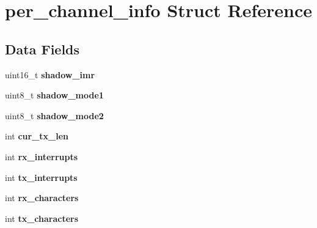 \hypertarget{structper__channel__info}{}\section{per\+\_\+channel\+\_\+info Struct Reference}
\label{structper__channel__info}
\subsection*{Data Fields}
\begin{DoxyCompactItemize}
\item 
\mbox{\label{structper__channel__info_af6ce27421bceddd53be377a7f917fdd1}} 
uint16\+\_\+t {\bfseries shadow\+\_\+imr}
\item 
\mbox{\label{structper__channel__info_af2a6c06b90cd4bfd4e2ef95c448a8348}} 
uint8\+\_\+t {\bfseries shadow\+\_\+mode1}
\item 
\mbox{\label{structper__channel__info_a6133c0e86639d3d1ed67bd2ced8e94af}} 
uint8\+\_\+t {\bfseries shadow\+\_\+mode2}
\item 
\mbox{\label{structper__channel__info_a99b17b566b4efcb23be59be997c257d8}} 
int {\bfseries cur\+\_\+tx\+\_\+len}
\item 
\mbox{\label{structper__channel__info_a194d2f8ec57e8b1c0d03ae6b77c2f6eb}} 
int {\bfseries rx\+\_\+interrupts}
\item 
\mbox{\label{structper__channel__info_a817fdb87b1f0e2ff9027e80e4ac5c6b7}} 
int {\bfseries tx\+\_\+interrupts}
\item 
\mbox{\label{structper__channel__info_a4834ddb1df6e134d4abe45a0e64ae777}} 
int {\bfseries rx\+\_\+characters}
\item 
\mbox{\label{structper__channel__info_a2e7639ca219b5bd9567a3e03b5eaca01}} 
int {\bfseries tx\+\_\+characters}
\item 
\mbox{\label{structper__channel__info_a1116c89962e5e7e9f2fb46afa0745088}} 

\end{DoxyCompactItemize}
